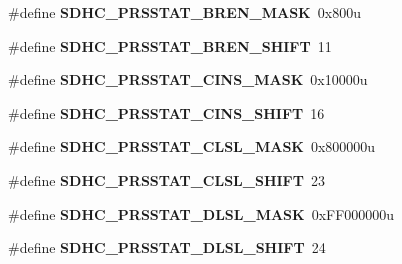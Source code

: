 \begin{DoxyCompactItemize}
\item 
\hypertarget{group___s_d_h_c___register___masks_ga9a1a3466ff4e6ec9067956296e917ebf}{}\#define {\bfseries S\+D\+H\+C\+\_\+\+P\+R\+S\+S\+T\+A\+T\+\_\+\+B\+R\+E\+N\+\_\+\+M\+A\+S\+K}~0x800u\label{group___s_d_h_c___register___masks_ga9a1a3466ff4e6ec9067956296e917ebf}

\item 
\hypertarget{group___s_d_h_c___register___masks_ga755afbadcc686b9a04f531081c5fb811}{}\#define {\bfseries S\+D\+H\+C\+\_\+\+P\+R\+S\+S\+T\+A\+T\+\_\+\+B\+R\+E\+N\+\_\+\+S\+H\+I\+F\+T}~11\label{group___s_d_h_c___register___masks_ga755afbadcc686b9a04f531081c5fb811}

\item 
\hypertarget{group___s_d_h_c___register___masks_ga48dc8b20e5092e223a378a1cba4803d1}{}\#define {\bfseries S\+D\+H\+C\+\_\+\+P\+R\+S\+S\+T\+A\+T\+\_\+\+C\+I\+N\+S\+\_\+\+M\+A\+S\+K}~0x10000u\label{group___s_d_h_c___register___masks_ga48dc8b20e5092e223a378a1cba4803d1}

\item 
\hypertarget{group___s_d_h_c___register___masks_ga3aaccd62a11f1cd2f842cd8d5f50ba79}{}\#define {\bfseries S\+D\+H\+C\+\_\+\+P\+R\+S\+S\+T\+A\+T\+\_\+\+C\+I\+N\+S\+\_\+\+S\+H\+I\+F\+T}~16\label{group___s_d_h_c___register___masks_ga3aaccd62a11f1cd2f842cd8d5f50ba79}

\item 
\hypertarget{group___s_d_h_c___register___masks_gab76b324ebb0b2d882ac0f8a1f563647d}{}\#define {\bfseries S\+D\+H\+C\+\_\+\+P\+R\+S\+S\+T\+A\+T\+\_\+\+C\+L\+S\+L\+\_\+\+M\+A\+S\+K}~0x800000u\label{group___s_d_h_c___register___masks_gab76b324ebb0b2d882ac0f8a1f563647d}

\item 
\hypertarget{group___s_d_h_c___register___masks_ga321c503ac2679cd51a2a30219a33d951}{}\#define {\bfseries S\+D\+H\+C\+\_\+\+P\+R\+S\+S\+T\+A\+T\+\_\+\+C\+L\+S\+L\+\_\+\+S\+H\+I\+F\+T}~23\label{group___s_d_h_c___register___masks_ga321c503ac2679cd51a2a30219a33d951}

\item 
\hypertarget{group___s_d_h_c___register___masks_gacc5e74fd893e00bf8d48d3ad7165de0a}{}\#define {\bfseries S\+D\+H\+C\+\_\+\+P\+R\+S\+S\+T\+A\+T\+\_\+\+D\+L\+S\+L\+\_\+\+M\+A\+S\+K}~0x\+F\+F000000u\label{group___s_d_h_c___register___masks_gacc5e74fd893e00bf8d48d3ad7165de0a}

\item 
\hypertarget{group___s_d_h_c___register___masks_ga6c5c346e4671cdebd3a2132924f059a1}{}\#define {\bfseries S\+D\+H\+C\+\_\+\+P\+R\+S\+S\+T\+A\+T\+\_\+\+D\+L\+S\+L\+\_\+\+S\+H\+I\+F\+T}~24\label{group___s_d_h_c___register___masks_ga6c5c346e4671cdebd3a2132924f059a1}


\end{DoxyCompactItemize}

